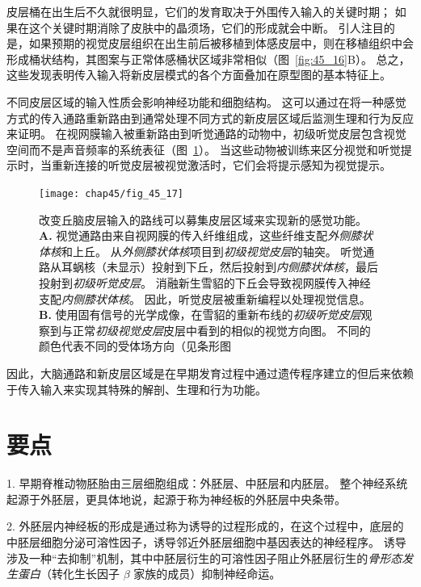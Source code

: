 皮层桶在出生后不久就很明显，它们的发育取决于外围传入输入的关键时期；
如果在这个关键时期消除了皮肤中的晶须场，它们的形成就会中断。
引人注目的是，如果预期的视觉皮层组织在出生前后被移植到体感皮层中，则在移植组织中会形成桶状结构，其图案与正常体感桶状区域非常相似（图~\ref{fig:45_16}B）。
总之，这些发现表明传入输入将新皮层模式的各个方面叠加在原型图的基本特征上。


不同皮层区域的输入性质会影响神经功能和细胞结构。
这可以通过在将一种感觉方式的传入通路重新路由到通常处理不同方式的新皮层区域后监测生理和行为反应来证明。
在视网膜输入被重新路由到听觉通路的动物中，初级听觉皮层包含视觉空间而不是声音频率的系统表征（图~\ref{fig:45_17}）。
当这些动物被训练来区分视觉和听觉提示时，当重新连接的听觉皮层被视觉激活时，它们会将提示感知为视觉提示。


\begin{figure}[htbp]
	\centering
	\texttt{[image: chap45/fig\_45\_17]}
	\caption{改变丘脑皮层输入的路线可以募集皮层区域来实现新的感觉功能\cite{sharma2000induction}。
		\textbf{A.} 视觉通路由来自视网膜的传入纤维组成，这些纤维支配\textit{外侧膝状体核}和上丘。
		从\textit{外侧膝状体核}项目到\textit{初级视觉皮层}的轴突。
		听觉通路从耳蜗核（未显示）投射到下丘，然后投射到\textit{内侧膝状体核}，最后投射到\textit{初级听觉皮层}。
		消融新生雪貂的下丘会导致视网膜传入神经支配\textit{内侧膝状体核}。
		因此，听觉皮层被重新编程以处理视觉信息。
		\textbf{B.} 使用固有信号的光学成像，在雪貂的重新布线的\textit{初级听觉皮层}观察到与正常\textit{初级视觉皮层}皮层中看到的相似的视觉方向图。
		不同的颜色代表不同的受体场方向（见条形图}
	\label{fig:45_17}
\end{figure}


因此，大脑通路和新皮层区域是在早期发育过程中通过遗传程序建立的但后来依赖于传入输入来实现其特殊的解剖、生理和行为功能。



\section{要点}

1. 早期脊椎动物胚胎由三层细胞组成：外胚层、中胚层和内胚层。
整个神经系统起源于外胚层，更具体地说，起源于称为神经板的外胚层中央条带。


2. 外胚层内神经板的形成是通过称为诱导的过程形成的，在这个过程中，底层的中胚层细胞分泌可溶性因子，诱导邻近外胚层细胞中基因表达的神经程序。
诱导涉及一种“去抑制”机制，其中中胚层衍生的可溶性因子阻止外胚层衍生的\textit{骨形态发生蛋白}（转化生长因子 $\beta$ 家族的成员）抑制神经命运。


